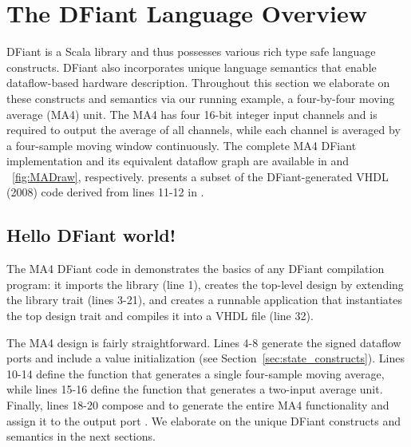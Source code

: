 \begin{table}[t!]
\label{fig:MADraw}
\end{table}

\section{The DFiant Language Overview}
\label{sec:dfiant}
DFiant is a Scala library and thus possesses various rich type safe language constructs. DFiant also incorporates unique language semantics that enable dataflow-based hardware description. Throughout this section we elaborate on these constructs and semantics via our running example, a four-by-four moving average (MA4) unit. The MA4 has four 16-bit integer input channels and is required to output the average of all channels, while each channel is averaged by a four-sample moving window continuously. The complete MA4 DFiant implementation and its equivalent dataflow graph are available in  and ~\ref{fig:MADraw}, respectively.  presents a subset of the DFiant-generated VHDL (2008) code derived from lines 11-12 in .


\subsection{Hello DFiant world!}
The MA4 DFiant code in  demonstrates the basics of any DFiant compilation program: it imports the  library (line 1), creates the top-level design by extending the  library trait (lines 3-21), and creates a runnable application that instantiates the top design trait and compiles it into a VHDL file (line 32). 

The MA4 design is fairly straightforward. Lines 4-8 generate the signed dataflow ports and include a  value initialization (see Section~\ref{sec:state_constructs}). 
Lines 10-14 define the function  that generates a single four-sample moving average, while lines 15-16 define the function  that generates a two-input average unit. Finally, lines 18-20 compose  and  to generate the entire MA4 functionality and assign it to the output port . We elaborate on the unique DFiant constructs and semantics in the next sections.


